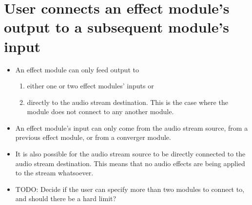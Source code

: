 \section{User connects an effect module's output to a subsequent module's input}


\begin{itemize}
	\item An effect module can only feed output to
	\begin{enumerate}
		\item either one or two effect modules' inputs or
		\item directly to the audio stream destination. This is the case where the module does not connect to any another module.
	\end{enumerate}
	
	\item An effect module's input can only come from the audio stream source, from a previous effect module, or from a converger module.

	\item It is also possible for the audio stream source to be directly connected to the audio stream destination. This means that no audio effects are being applied to the stream whatsoever. 

	\item TODO: Decide if the user can specify more than two modules to connect to, and should there be a hard limit?
	


\end{itemize}